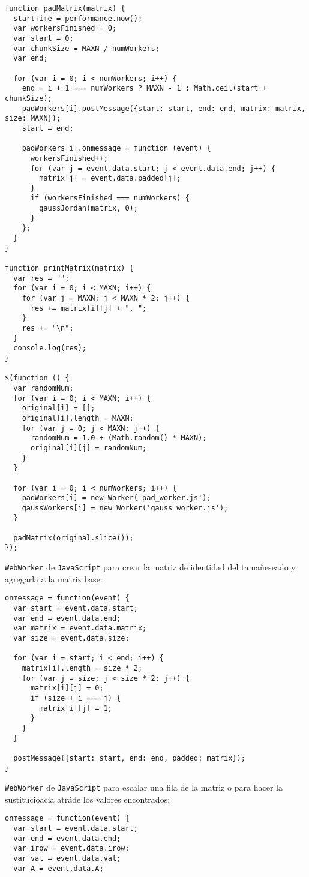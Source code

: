 \documentclass[10pt,letterpaper,oneside]{article}
\begin{document}
{\begin{verbatim}
function padMatrix(matrix) {
  startTime = performance.now();
  var workersFinished = 0;
  var start = 0;
  var chunkSize = MAXN / numWorkers;
  var end;

  for (var i = 0; i < numWorkers; i++) {
    end = i + 1 === numWorkers ? MAXN - 1 : Math.ceil(start + chunkSize);
    padWorkers[i].postMessage({start: start, end: end, matrix: matrix, size: MAXN});
    start = end;

    padWorkers[i].onmessage = function (event) {
      workersFinished++;
      for (var j = event.data.start; j < event.data.end; j++) {
        matrix[j] = event.data.padded[j];
      }
      if (workersFinished === numWorkers) {
        gaussJordan(matrix, 0);
      }
    };
  }
}

function printMatrix(matrix) {
  var res = "";
  for (var i = 0; i < MAXN; i++) {
    for (var j = MAXN; j < MAXN * 2; j++) {
      res += matrix[i][j] + ", ";
    }
    res += "\n";
  }
  console.log(res);
}

$(function () {
  var randomNum;
  for (var i = 0; i < MAXN; i++) {
    original[i] = [];
    original[i].length = MAXN;
    for (var j = 0; j < MAXN; j++) {
      randomNum = 1.0 + (Math.random() * MAXN);
      original[i][j] = randomNum;
    }
  }

  for (var i = 0; i < numWorkers; i++) {
    padWorkers[i] = new Worker('pad_worker.js');
    gaussWorkers[i] = new Worker('gauss_worker.js');
  }

  padMatrix(original.slice());
});
\end{verbatim}

\verb!WebWorker! de \verb!JavaScript! para crear la matriz de identidad del tamañeseado y agregarla a la matriz base:
\begin{verbatim}
onmessage = function(event) {
  var start = event.data.start;
  var end = event.data.end;
  var matrix = event.data.matrix;
  var size = event.data.size;

  for (var i = start; i < end; i++) {
    matrix[i].length = size * 2;
    for (var j = size; j < size * 2; j++) {
      matrix[i][j] = 0;
      if (size + i === j) {
        matrix[i][j] = 1;
      }
    }
  }

  postMessage({start: start, end: end, padded: matrix});
}
\end{verbatim}

\verb!WebWorker! de \verb!JavaScript! para escalar una fila de la matriz o para hacer la sustitucióacia atráde los valores encontrados:
\begin{verbatim}
onmessage = function(event) {
  var start = event.data.start;
  var end = event.data.end;
  var irow = event.data.irow;
  var val = event.data.val;
  var A = event.data.A;


\end{verbatim}}
\end{document}
